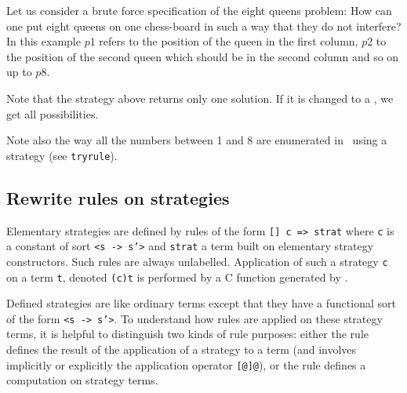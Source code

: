 \FEX


\EX Let us consider a brute force specification of the eight queens
problem: How can one put eight queens on one chess-board in such a way
that they do not interfere? In this example $p1$ refers to the
position of the queen in the first column, $p2$ to the position of the
second queen which should be in the second column and so on up to
$p8$.\\




Note that the strategy above returns only one solution. If it is
changed to a , we get all possibilities.

Note also the way all the numbers between 1 and 8 are enumerated in
\elan\ using a  strategy (see {\tt tryrule}).

\FEX 


\subsection{Rewrite rules on strategies}
\label{Rewrite rules on strategies}

Elementary strategies are defined by rules of the form
\texttt{[] c => strat} where \texttt{c} is a constant of sort
\texttt{<s -> s'>} and  \texttt{strat}
a term built on elementary strategy constructors.
Such rules are always unlabelled.
Application of such a strategy \texttt{c} on a term \texttt{t},
denoted \texttt{(c)t} is performed by a C function generated by
\elan.

Defined strategies are like ordinary terms except that they have a 
functional sort of the form \texttt{<s -> s'>}.
To understand how rules are applied on these strategy terms, it is 
helpful to distinguish two kinds of rule purposes:
either the rule defines the result of the application of a strategy 
to a term (and involves implicitly or explicitly the application
operator \texttt{[@]@}), 
or the rule  defines a computation on strategy terms.

